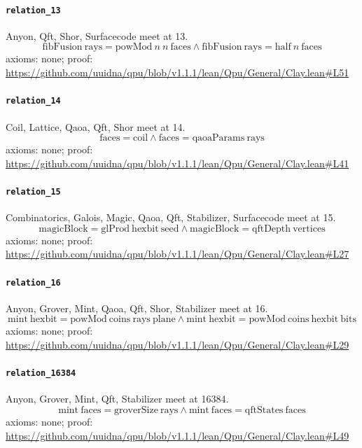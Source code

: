 \documentclass[11pt]{article}
\begin{document}
\paragraph{\texttt{relation\_13}}
Anyon, Qft, Shor, Surfacecode meet at 13.
\[ \mathrm{fibFusion}\ \mathrm{rays} = \mathrm{powMod}\ n\ n\ \mathrm{faces} \land \mathrm{fibFusion}\ \mathrm{rays} = \mathrm{half}\ n\ \mathrm{faces} \]
\noindent axioms: none; proof: \url{https://github.com/uuidna/qpu/blob/v1.1.1/lean/Qpu/General/Clay.lean\#L51}

\paragraph{\texttt{relation\_14}}
Coil, Lattice, Qaoa, Qft, Shor meet at 14.
\[ \mathrm{faces} = \mathrm{coil} \land \mathrm{faces} = \mathrm{qaoaParams}\ \mathrm{rays} \]
\noindent axioms: none; proof: \url{https://github.com/uuidna/qpu/blob/v1.1.1/lean/Qpu/General/Clay.lean\#L41}

\paragraph{\texttt{relation\_15}}
Combinatorics, Galois, Magic, Qaoa, Qft, Stabilizer, Surfacecode meet at 15.
\[ \mathrm{magicBlock} = \mathrm{glProd}\ \mathrm{hexbit}\ \mathrm{seed} \land \mathrm{magicBlock} = \mathrm{qftDepth}\ \mathrm{vertices} \]
\noindent axioms: none; proof: \url{https://github.com/uuidna/qpu/blob/v1.1.1/lean/Qpu/General/Clay.lean\#L27}

\paragraph{\texttt{relation\_16}}
Anyon, Grover, Mint, Qaoa, Qft, Shor, Stabilizer meet at 16.
\[ \mathrm{mint}\ \mathrm{hexbit} = \mathrm{powMod}\ \mathrm{coins}\ \mathrm{rays}\ \mathrm{plane} \land \mathrm{mint}\ \mathrm{hexbit} = \mathrm{powMod}\ \mathrm{coins}\ \mathrm{hexbit}\ \mathrm{bits} \]
\noindent axioms: none; proof: \url{https://github.com/uuidna/qpu/blob/v1.1.1/lean/Qpu/General/Clay.lean\#L29}

\paragraph{\texttt{relation\_16384}}
Anyon, Grover, Mint, Qft, Stabilizer meet at 16384.
\[ \mathrm{mint}\ \mathrm{faces} = \mathrm{groverSize}\ \mathrm{rays} \land \mathrm{mint}\ \mathrm{faces} = \mathrm{qftStates}\ \mathrm{faces} \]
\noindent axioms: none; proof: \url{https://github.com/uuidna/qpu/blob/v1.1.1/lean/Qpu/General/Clay.lean\#L49}
\end{document}
